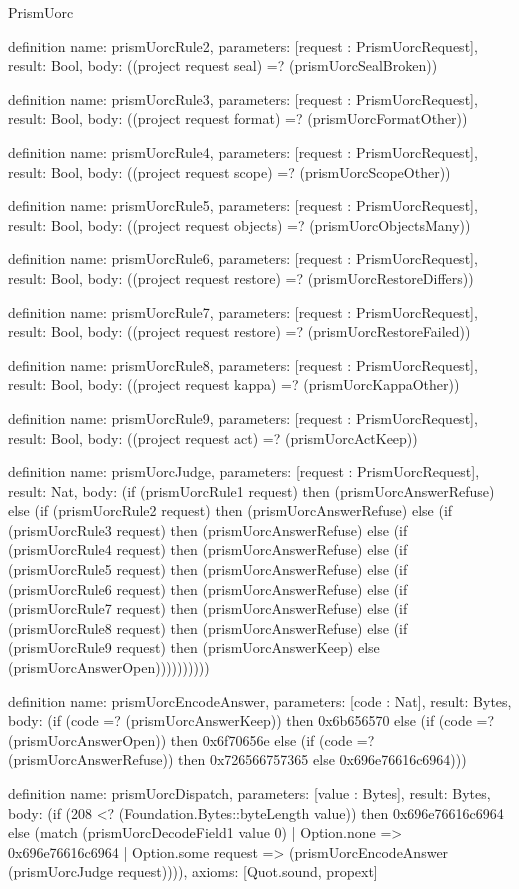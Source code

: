 \begin{lexlean}{PrismUorc}
\begin{semanticmodule}
definition{
  name: prismUorcRule2,
  parameters: [request : PrismUorcRequest],
  result: Bool,
  body: ((project request seal) =? (prismUorcSealBroken))
}

definition{
  name: prismUorcRule3,
  parameters: [request : PrismUorcRequest],
  result: Bool,
  body: ((project request format) =? (prismUorcFormatOther))
}

definition{
  name: prismUorcRule4,
  parameters: [request : PrismUorcRequest],
  result: Bool,
  body: ((project request scope) =? (prismUorcScopeOther))
}

definition{
  name: prismUorcRule5,
  parameters: [request : PrismUorcRequest],
  result: Bool,
  body: ((project request objects) =? (prismUorcObjectsMany))
}

definition{
  name: prismUorcRule6,
  parameters: [request : PrismUorcRequest],
  result: Bool,
  body: ((project request restore) =? (prismUorcRestoreDiffers))
}

definition{
  name: prismUorcRule7,
  parameters: [request : PrismUorcRequest],
  result: Bool,
  body: ((project request restore) =? (prismUorcRestoreFailed))
}

definition{
  name: prismUorcRule8,
  parameters: [request : PrismUorcRequest],
  result: Bool,
  body: ((project request kappa) =? (prismUorcKappaOther))
}

definition{
  name: prismUorcRule9,
  parameters: [request : PrismUorcRequest],
  result: Bool,
  body: ((project request act) =? (prismUorcActKeep))
}

definition{
  name: prismUorcJudge,
  parameters: [request : PrismUorcRequest],
  result: Nat,
  body: (if (prismUorcRule1 request) then (prismUorcAnswerRefuse) else (if (prismUorcRule2 request) then (prismUorcAnswerRefuse) else (if (prismUorcRule3 request) then (prismUorcAnswerRefuse) else (if (prismUorcRule4 request) then (prismUorcAnswerRefuse) else (if (prismUorcRule5 request) then (prismUorcAnswerRefuse) else (if (prismUorcRule6 request) then (prismUorcAnswerRefuse) else (if (prismUorcRule7 request) then (prismUorcAnswerRefuse) else (if (prismUorcRule8 request) then (prismUorcAnswerRefuse) else (if (prismUorcRule9 request) then (prismUorcAnswerKeep) else (prismUorcAnswerOpen))))))))))
}

definition{
  name: prismUorcEncodeAnswer,
  parameters: [code : Nat],
  result: Bytes,
  body: (if (code =? (prismUorcAnswerKeep)) then 0x6b656570 else (if (code =? (prismUorcAnswerOpen)) then 0x6f70656e else (if (code =? (prismUorcAnswerRefuse)) then 0x726566757365 else 0x696e76616c6964)))
}

definition{
  name: prismUorcDispatch,
  parameters: [value : Bytes],
  result: Bytes,
  body: (if (208 <? (Foundation.Bytes::byteLength value)) then 0x696e76616c6964 else (match (prismUorcDecodeField1 value 0)
    | Option.none => 0x696e76616c6964
    | Option.some request => (prismUorcEncodeAnswer (prismUorcJudge request)))),
  axioms: [Quot.sound, propext]
}
\end{semanticmodule}
\end{lexlean}
